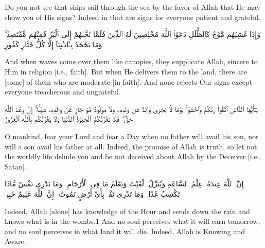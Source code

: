 \begin{translation}
	Do you not see that ships sail through the sea by the favor of Allah that He may show you of His signs? Indeed in that are signs for everyone patient and grateful.
\end{translation}


\begin{edition*}
	\begin{Arabic}
		وَإِذَا غَشِيَهُم مَّوْجٌ كَٱلظُّلَلِ دَعَوُا۟ ٱللَّهَ مُخْلِصِينَ لَهُ ٱلدِّينَ فَلَمَّا نَجَّىٰهُمْ إِلَى ٱلْبَرِّ فَمِنْهُم مُّقْتَصِدٌ ۚ وَمَا يَجْحَدُ بِـَٔايَـٰتِنَآ إِلَّا كُلُّ خَتَّارٍ كَفُورٍ
	\end{Arabic}
\end{edition*}

\begin{translation}
	And when waves come over them like canopies, they supplicate Allah, sincere to Him in religion [i.e., faith]. But when He delivers them to the land, there are [some] of them who are moderate [in faith]. And none rejects Our signs except everyone treacherous and ungrateful.
\end{translation}


\begin{edition*}
	\begin{Arabic}
		يَـٰٓأَيُّهَا ٱلنَّاسُ ٱتَّقُوا۟ رَبَّكُمْ وَٱخْشَوْا۟ يَوْمًا لَّا يَجْزِى وَالِدٌ عَن وَلَدِهِۦ وَلَا مَوْلُودٌ هُوَ جَازٍ عَن وَالِدِهِۦ شَيْـًٔا ۚ إِنَّ وَعْدَ ٱللَّهِ حَقٌّ ۖ فَلَا تَغُرَّنَّكُمُ ٱلْحَيَوٰةُ ٱلدُّنْيَا وَلَا يَغُرَّنَّكُم بِٱللَّهِ ٱلْغَرُورُ
	\end{Arabic}
\end{edition*}

\begin{translation}
	O mankind, fear your Lord and fear a Day when no father will avail his son, nor will a son avail his father at all. Indeed, the promise of Allah is truth, so let not the worldly life delude you and be not deceived about Allah by the Deceiver [i.e., Satan].
\end{translation}


\begin{edition*}
	\begin{Arabic}
		إِنَّ ٱللَّهَ عِندَهُۥ عِلْمُ ٱلسَّاعَةِ وَيُنَزِّلُ ٱلْغَيْثَ وَيَعْلَمُ مَا فِى ٱلْأَرْحَامِ ۖ وَمَا تَدْرِى نَفْسٌ مَّاذَا تَكْسِبُ غَدًا ۖ وَمَا تَدْرِى نَفْسٌۢ بِأَىِّ أَرْضٍ تَمُوتُ ۚ إِنَّ ٱللَّهَ عَلِيمٌ خَبِيرٌۢ
	\end{Arabic}
\end{edition*}

\begin{translation}
	Indeed, Allah [alone] has knowledge of the Hour and sends down the rain and knows what is in the wombs.1 And no soul perceives what it will earn tomorrow, and no soul perceives in what land it will die. Indeed, Allah is Knowing and Aware.
\end{translation}

